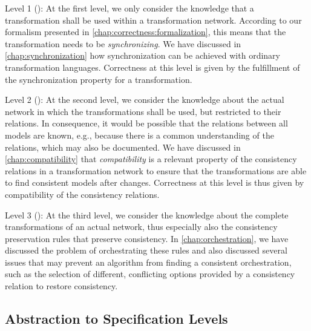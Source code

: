 \begin{properdescription}
\item[Level 1 (\emph{\LevelTransformation}):] 
At the first level, we only consider the knowledge that a transformation shall be used within a transformation network.
According to our formalism presented in \autoref{chap:correctness:formalization}, this means that the transformation needs to be \emph{synchronizing}.
We have discussed in \autoref{chap:synchronization} how synchronization can be achieved with ordinary transformation languages.
Correctness at this level is given by the fulfillment of the synchronization property for a transformation.

\item[Level 2 (\emph{\LevelNetworkRelation}):] 
At the second level, we consider the knowledge about the actual network in which the transformations shall be used, but restricted to their relations.
In consequence, it would be possible that the relations between all models are known, e.g., because there is a common understanding of the relations, which may also be documented.
We have discussed in \autoref{chap:compatibility} that \emph{compatibility} is a relevant property of the consistency relations in a transformation network to ensure that the transformations are able to find consistent models after changes.
Correctness at this level is thus given by compatibility of the consistency relations.

\item[Level 3 (\emph{\LevelNetworkRule}):] 
At the third level, we consider the knowledge about the complete transformations of an actual network, thus especially also the consistency preservation rules that preserve consistency.
In \autoref{chap:orchestration}, we have discussed the problem of orchestrating these rules and also discussed several issues that may prevent an algorithm from finding a consistent orchestration, such as the selection of different, conflicting options provided by a consistency relation to restore consistency.

\end{properdescription}


\subsection{Abstraction to Specification Levels}

